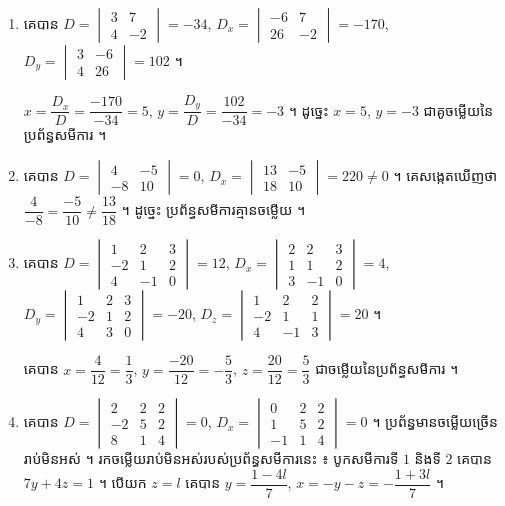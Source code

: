 \begin{enumerate}[a]
  \item គេបាន $D = \begin{vmatrix} 3 & 7\\ 4 & -2 \end{vmatrix} = -34$, $D_x = \begin{vmatrix} -6 & 7\\ 26 & -2 \end{vmatrix} = -170$, $D_y = \begin{vmatrix} 3 & -6\\ 4 & 26 \end{vmatrix} = 102$ ។

  $x = \dfrac{D_x}{D} = \dfrac{-170}{-34} = 5$, $y = \dfrac{D_y}{D} = \dfrac{102}{-34} = -3$ ។ ដូច្នេះ $x = 5$, $y = -3$ ជាគូចម្លើយនៃប្រព័ន្ធសមីការ ។
  \item គេបាន $D = \begin{vmatrix} 4 & -5\\ -8 & 10 \end{vmatrix} = 0$, $D_x = \begin{vmatrix} 13 & -5\\ 18 & 10 \end{vmatrix} = 220 \ne 0$ ។ គេសង្កេតឃើញថា $\dfrac{4}{-8} = \dfrac{-5}{10} \ne \dfrac{13}{18}$ ។ ដូច្នេះ ប្រព័ន្ធសមីការគ្មានចម្លើយ ។
  \item គេបាន $D = \begin{vmatrix} 1 & 2 & 3\\ -2 & 1 & 2\\ 4 & -1 & 0 \end{vmatrix} = 12$, $D_x = \begin{vmatrix} 2 & 2 & 3\\ 1 & 1 & 2\\ 3 & -1 & 0 \end{vmatrix} = 4$, $D_y = \begin{vmatrix} 1 & 2 & 3\\ -2 & 1 & 2\\ 4 & 3 & 0 \end{vmatrix} = -20$, $D_z = \begin{vmatrix} 1 & 2 & 2\\ -2 & 1 & 1\\ 4 & -1 & 3 \end{vmatrix} = 20$ ។

  គេបាន $x = \dfrac{4}{12} = \dfrac{1}{3}$, $y = \dfrac{-20}{12} = -\dfrac{5}{3}$, $z = \dfrac{20}{12} = \dfrac{5}{3}$ ជាចម្លើយនៃប្រព័ន្ធសមីការ ។
  \item គេបាន $D = \begin{vmatrix} 2 & 2 & 2\\ -2 & 5 & 2\\ 8 & 1 & 4 \end{vmatrix} = 0$, $D_x = \begin{vmatrix} 0 & 2 & 2\\ 1 & 5 & 2\\ -1 & 1 & 4 \end{vmatrix} = 0$ ។ ប្រព័ន្ធមានចម្លើយច្រើនរាប់មិនអស់ ។ រកចម្លើយរាប់មិនអស់របស់ប្រព័ន្ធសមីការនេះ ៖ បូកសមីការទី $1$ និងទី $2$ គេបាន $7y + 4z = 1$ ។ បើយក $z = l$ គេបាន $y = \dfrac{1 - 4l}{7}$, $x = -y - z = -\dfrac{1 + 3l}{7}$ ។


\end{enumerate}
